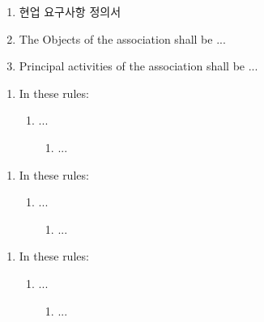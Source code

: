 
\setcounter {section}{0}


\begin{enumerate}
    \item 현업 요구사항 정의서
    \item The Objects of the association shall be ...
    \item Principal activities of the association shall be ...
\end{enumerate}


\begin{enumerate}
    \item In these rules:
    \begin{enumerate}
        \item ...
        \begin{enumerate}
            \item ...
        \end{enumerate}
    \end{enumerate}    
\end{enumerate}



\begin{enumerate}
    \item In these rules:
    \begin{enumerate}
        \item ...
        \begin{enumerate}
            \item ...
        \end{enumerate}
    \end{enumerate}    
\end{enumerate}



\begin{enumerate}
    \item In these rules:
    \begin{enumerate}
        \item ...
        \begin{enumerate}
            \item ...
        \end{enumerate}
    \end{enumerate}    
\end{enumerate}

